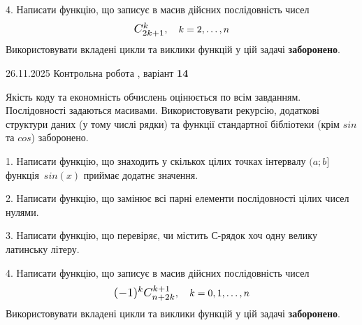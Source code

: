 \documentclass[11pt, ukrainian]{article}
\begin{document}
{{{{{{{{{{{{{\begin {large}

4. 
Написати функцію, що записує в масив дійсних послідовність чисел
$$\scalebox{1.2}{$C_{2k+1}^{k}$}, \quad k=2,\ldots,n$$
\quad Використовувати вкладені цикли та виклики функцій у цій задачі \textbf{заборонено}.

\vspace{2mm}

\end{large}
\vspace{20mm}


{{26.11.2025 Контрольна робота , варіант  \No \textbf { 14 }\par}}


{
Якість коду та економність обчислень оцінюється по всім завданням. Послідовності задаються масивами. Використовувати рекурсію, додаткові структури даних (у тому числі рядки) та функції стандартної бібліотеки (крім $sin$ та $cos$) заборонено.

\vspace{2mm}

\begin {large}
1. Написати функцію, що знаходить у скількох цілих точках інтервалу $(a; b]$ функція~$sin(x)$ приймає додатнє значення.

\vspace{2mm}


2. Написати функцію, що замінює всі парні елементи послідовності цілих чисел нулями.

\vspace{2mm}


3. Написати функцію, що перевіряє, чи містить С-рядок хоч одну велику латинську літеру.

\vspace{2mm}


4. 
Написати функцію, що записує в масив дійсних послідовність чисел
$$\scalebox{1.2}{$(-1)^{k}C_{n+2k}^{k+1}$}, \quad k=0,1,\ldots,n$$
\quad Використовувати вкладені цикли та виклики функцій у цій задачі \textbf{заборонено}.


\end{large}}}}}}}}}}}}}}}
\end{document}
